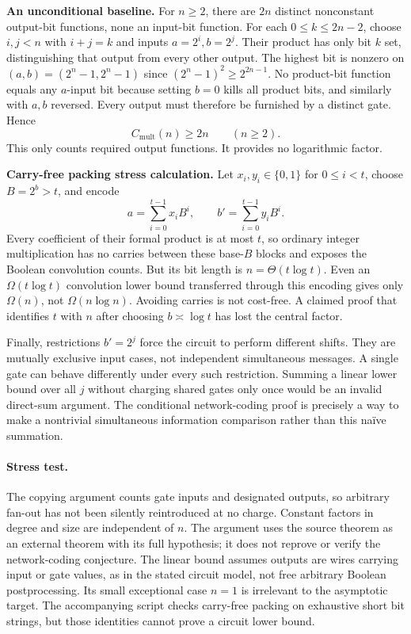 \documentclass[11pt,a4paper]{article}
\numberwithin{equation}{section}
\begin{document}
\textbf{An unconditional baseline.} For $n\ge2$, there are $2n$ distinct nonconstant output-bit functions, none an input-bit function. For each $0\le k\le2n-2$, choose $i,j<n$ with $i+j=k$ and inputs $a=2^i,b=2^j$. Their product has only bit $k$ set, distinguishing that output from every other output. The highest bit is nonzero on $(a,b)=(2^n-1,2^n-1)$ since $(2^n-1)^2\ge2^{2n-1}$. No product-bit function equals any $a$-input bit because setting $b=0$ kills all product bits, and similarly with $a,b$ reversed. Every output must therefore be furnished by a distinct gate. Hence
\[
 C_{\mathrm{mult}}(n)\ge2n\qquad(n\ge2).
\]
This only counts required output functions. It provides no logarithmic factor.

\textbf{Carry-free packing stress calculation.} Let $x_i,y_i\in\{0,1\}$ for $0\le i<t$, choose $B=2^b>t$, and encode
\[
 a=\sum_{i=0}^{t-1}x_iB^i,\qquad b'=\sum_{i=0}^{t-1}y_iB^i.
\]
Every coefficient of their formal product is at most $t$, so ordinary integer multiplication has no carries between these base-$B$ blocks and exposes the Boolean convolution counts. But its bit length is $n=\Theta(t\log t)$. Even an $\Omega(t\log t)$ convolution lower bound transferred through this encoding gives only $\Omega(n)$, not $\Omega(n\log n)$. Avoiding carries is not cost-free. A claimed proof that identifies $t$ with $n$ after choosing $b\asymp\log t$ has lost the central factor.

Finally, restrictions $b'=2^j$ force the circuit to perform different shifts. They are mutually exclusive input cases, not independent simultaneous messages. A single gate can behave differently under every such restriction. Summing a linear lower bound over all $j$ without charging shared gates only once would be an invalid direct-sum argument. The conditional network-coding proof is precisely a way to make a nontrivial simultaneous information comparison rather than this naïve summation.

\paragraph{Stress test.}
The copying argument counts gate inputs and designated outputs, so arbitrary fan-out has not been silently reintroduced at no charge. Constant factors in degree and size are independent of $n$. The argument uses the source theorem as an external theorem with its full hypothesis; it does not reprove or verify the network-coding conjecture. The linear bound assumes outputs are wires carrying input or gate values, as in the stated circuit model, not free arbitrary Boolean postprocessing. Its small exceptional case $n=1$ is irrelevant to the asymptotic target. The accompanying script checks carry-free packing on exhaustive short bit strings, but those identities cannot prove a circuit lower bound.
\end{document}
